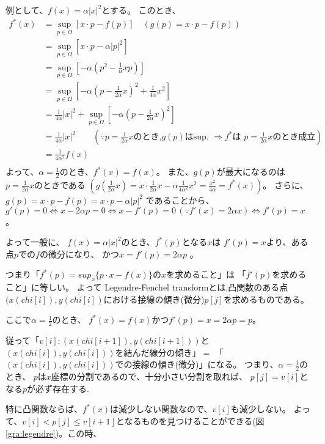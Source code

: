 例として、$f(x) = \alpha |x|^2$とする。
このとき、
\begin{align*}
f^*(x) &= \displaystyle \sup_{p\in \Omega}{[x \cdot p - f(p)]} \quad (g(p) = x \cdot p - f(p))\\
           &=\displaystyle \sup_{p\in \Omega}{[x \cdot p - \alpha |p|^2]}\\
           &= \displaystyle \sup_{p\in \Omega}{[- \alpha(p^2 - \frac{1}{\alpha}xp)]}\\
           &= \displaystyle \sup_{p\in \Omega}{[- \alpha(p - \frac{1}{2 \alpha}x)^2 +  \frac{1}{4 \alpha}x^2]}\\
           &=  \frac{1}{4 \alpha}|x|^2 + \sup_{p\in \Omega}{[- \alpha(p - \frac{1}{2 \alpha}x)^2]}\\
           &= \frac{1}{4 \alpha}|x|^2 \qquad (\because  \text{$p = \frac{1}{2 \alpha}x$のとき,$g(p)$はsup.  $\Rightarrow f^*$は $p = \frac{1}{2 \alpha}x$のとき成立})\\
           &= \frac{1}{4 \alpha^2}f(x)\\
\end{align*}
よって、$\alpha = \frac{1}{2}$のとき、$f^*(x) = f(x)。$
また、$g(p)$が最大になるのは$p = \frac{1}{2 \alpha}x$のときである
$(g( \frac{1}{2 \alpha}x) = x \cdot \frac{1}{2 \alpha}x - \alpha  \frac{1}{4 \alpha^2}x^2 =  \frac{x^2}{4 \alpha} = f^*(x))$。
さらに、
$g(p) = x \cdot p - f(p)= x \cdot p - \alpha |p|^2$
であることから、
$g'(p) = 0 \Leftrightarrow x - 2 \alpha p = 0 \Leftrightarrow x - f'(p) = 0 \, (\because f'(x) = 2 \alpha x) \Leftrightarrow f'(p) = x$ 。

よって一般に、 $f(x) = \alpha |x| ^2$のとき、$f^*(p)$となる$x$は $f'(p) = x$より、ある点$p$での$f$の微分になり、 
かつ$x = f'(p) = 2\alpha p$ 。

つまり「$f^*(p)= sup_x\{p \cdot x - f(x) \} $の$x$を求めること」は 「$f'(p)$を求めること」に等しい。
よって Legendre-Fenchel transformとは,凸関数のある点$(x(chi[i]), y(chi[i])$における接線の傾き(微分)$p[j]$を求めるものである。


ここで$\alpha = \frac{1}{2}$のとき、 $f^*(x) = f(x) かつf'(p) = x = 2\alpha p = p$。

従って「$v[i]: (x(chi[i+1]), y(chi[i+1]))$と$(x(chi[i]), y(chi[i]))$を結んだ線分の傾き」$=$ 「$(x(chi[i]), y(chi[i]))$での接線の傾き(微分)」になる。
つまり、$\alpha = \frac{1}{2}$のとき、 $p$は$x$座標の分割であるので、十分小さい分割を取れば、 $p[j] = v[i]$となる$p$が必ず存在する.

特に凸関数ならば、$f^*(x)$は減少しない関数なので、$v[i]$も減少しない。
よって、$v[i] < p[j] \leq v[i+1]$となるものを見つけることができる(図\ref{gra:legendre})。この時、

